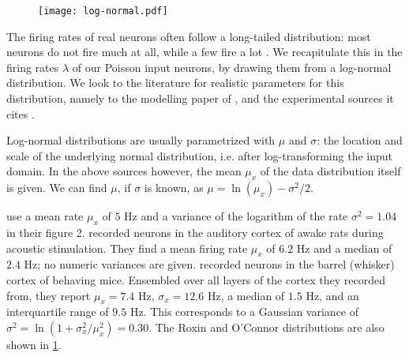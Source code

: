 \begin{figure}
    \hspace*{-4em}
    \texttt{[image: log-normal.pdf]}
    \label{fig:log-normal}
\end{figure}

The firing rates of real neurons often follow a long-tailed distribution: most neurons do not fire much at all, while a few fire a lot \cite{Mizuseki2013PreconfiguredSkewedDistribution,Hromadka2008SparseRepresentationSounds,Shafi2007VariabilityNeuronalActivity}. We recapitulate this in the firing rates $λ$ of our Poisson input neurons, by drawing them from a log-normal distribution. We look to the literature for realistic parameters for this distribution, namely to the modelling paper of , and the experimental sources it cites \cite{Hromadka2008SparseRepresentationSounds,OConnor2010NeuralActivityBarrel}.

Log-normal distributions are usually parametrized with $μ$ and $σ$: the location and scale of the underlying normal distribution, i.e. after log-transforming the input domain. In the above sources however, the mean $μ_x$ of the data distribution itself is given. We can find $μ$, if $σ$ is known, as $μ = \ln(μ_x) - σ^2 / 2$.

 use a mean rate $μ_x$ of $5$ Hz and a variance of the logarithm of the rate $σ^2 = 1.04$ in their figure 2.  recorded neurons in the auditory cortex of awake rats during acoustic stimulation. They find a mean firing rate $μ_x$ of $6.2$ Hz and a median of $2.4$ Hz; no numeric variances are given.  recorded neurons in the barrel (whisker) cortex of behaving mice. Ensembled over all layers of the cortex they recorded from, they report $μ_x = 7.4$ Hz, $σ_x = 12.6$ Hz, a median of $1.5$ Hz, and an interquartile range of $9.5$ Hz. This corresponds to a Gaussian variance of $σ^2 = \ln(1 + σ_x^2 / μ_x^2) = 0.30$. The Roxin and O'Connor distributions are also shown in \cref{fig:log-normal}.

